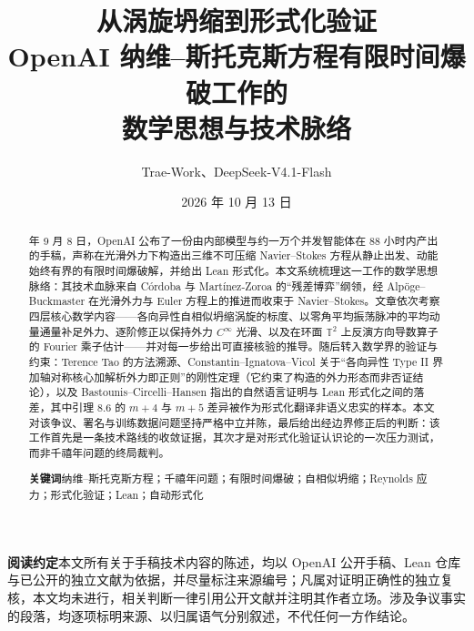 \documentclass[11pt,a4paper]{article}
\title{\vspace{-1.2cm}\color{navy}\bfseries 从涡旋坍缩到形式化验证\\[0.3em]
\Large OpenAI 纳维--斯托克斯方程有限时间爆破工作的\\[0.2em]数学思想与技术脉络}
\author{Trae-Work、DeepSeek-V4.1-Flash}
\date{2026 年 10 月 13 日}
\theoremstyle{plain}
\theoremstyle{definition}
\theoremstyle{remark}
\newcommand{\NS}{Navier--Stokes}
\begin{document}
\maketitle
\thispagestyle{empty}

\begin{abstract}
 年 9 月 8 日，OpenAI 公布了一份由内部模型与约一万个并发智能体在 88 小时内产出的手稿，声称在光滑外力下构造出三维不可压缩 \NS{} 方程从静止出发、动能始终有界的有限时间爆破解，并给出 Lean 形式化。本文系统梳理这一工作的数学思想脉络：其技术血脉来自 Córdoba 与 Martínez-Zoroa 的“残差博弈”纲领，经 Alpöge--Buckmaster 在光滑外力与 Euler 方程上的推进而收束于 \NS{}。文章依次考察四层核心数学内容——各向异性自相似坍缩涡旋的标度、以零角平均振荡脉冲的平均动量通量补足外力、逐阶修正以保持外力 $C^{\infty}$ 光滑、以及在环面 $\mathbb{T}^{2}$ 上反演方向导数算子的 Fourier 乘子估计——并对每一步给出可直接核验的推导。随后转入数学界的验证与约束：Terence Tao 的方法溯源、Constantin--Ignatova--Vicol 关于“各向异性 Type II 界加轴对称核心加解析外力即正则”的刚性定理（它约束了构造的外力形态而非否证结论），以及 Bastounis--Circelli--Hansen 指出的自然语言证明与 Lean 形式化之间的落差，其中引理 8.6 的 $m+4$ 与 $m+5$ 差异被作为形式化翻译非语义忠实的样本。本文对该争议、署名与训练数据问题坚持严格中立并陈，最后给出经边界修正后的判断：该工作首先是一条技术路线的收敛证据，其次才是对形式化验证认识论的一次压力测试，而非千禧年问题的终局裁判。

\vspace{0.5em}
\noindent\textbf{关键词}\quad 纳维--斯托克斯方程；千禧年问题；有限时间爆破；自相似坍缩；Reynolds 应力；形式化验证；Lean；自动形式化
\end{abstract}

\vspace{0.6em}
\begin{keybox}
\textbf{阅读约定}\quad 本文所有关于手稿技术内容的陈述，均以 OpenAI 公开手稿、Lean 仓库与已公开的独立文献为依据，并尽量标注来源编号；凡属对证明正确性的独立复核，本文均未进行，相关判断一律引用公开文献并注明其作者立场。涉及争议事实的段落，均逐项标明来源、以归属语气分别叙述，不代任何一方作结论。
\end{keybox}

\vspace{0.5em}
{\small
\setlength{\parskip}{2pt}
\tableofcontents}

\clearpage




\end{document}
